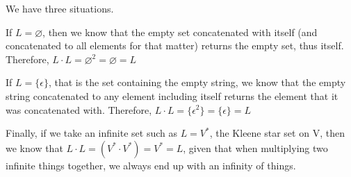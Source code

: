 \documentclass[10pt]{article}
\newenvironment{AnswerBox}{\begin{mdframed}[style=simple]}{\end{mdframed}}
\begin{document}
\begin{AnswerBox}%

We have three situations. 

If $L = \varnothing$, then we know that the empty set concatenated with itself (and concatenated to all elements for that matter) returns the empty set, thus itself. Therefore, $L \cdot L = \varnothing^2 = \varnothing = L$

If $L = \{\epsilon \}$, that is the set containing the empty string, we know that the empty string concatenated to any element including itself returns the element that it was concatenated with. Therefore, $L \cdot L = \{\epsilon^2 \} = \{\epsilon\} = L$

Finally, if we take an infinite set such as $L = V^*$, the Kleene star set on V, then we know that $L \cdot L = (V^* \cdot V^*) = V^* = L$, given that when multiplying two infinite things together, we always end up with an infinity of things.
\end{AnswerBox}%
\end{document}
